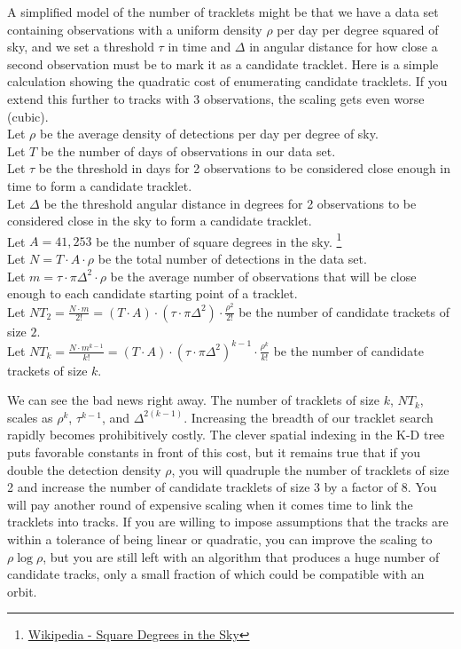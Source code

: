 A simplified model of the number of tracklets might be that we have a data set containing 
observations with a uniform density $\rho$ per day per degree squared of sky,
and we set a threshold $\tau$ in time and $\Delta$ in angular distance for how close a second observation must be to mark it as a candidate tracklet.
Here is a simple calculation showing the quadratic cost of enumerating candidate tracklets. 
If you extend this further to tracks with 3 observations, the scaling gets even worse (cubic).\\
Let $\rho$ be the average density of detections per day per degree of sky.\\
Let $T$ be the number of days of observations in our data set.\\
Let $\tau$ be the threshold in days for 2 observations to be considered close enough in time to form a candidate tracklet.\\
Let $\Delta$ be the threshold angular distance in degrees for 2 observations to be considered close in the sky to form a candidate tracklet.\\
Let $A = 41,253$ be the number of square degrees in the sky.
\footnote{\href{https://en.wikipedia.org/wiki/Square_degree}{Wikipedia - Square Degrees in the Sky}}\\
Let $N = T \cdot A \cdot \rho $ be the total number of detections in the data set.\\
Let $\displaystyle{m = \tau \cdot \pi \Delta^2 \cdot \rho}$ be the average number of observations that will be close enough
to each candidate starting point of a tracklet.\\
Let $\displaystyle{NT_{2} = \frac{N \cdot m}{2!} = (T \cdot A) \cdot (\tau \cdot \pi \Delta^2) \cdot \frac{\rho^{2}}{2!} }$ 
be the number of candidate trackets of size $2$. \\
Let $\displaystyle{NT_{k} = \frac{N \cdot m^{k-1}}{k!} = (T \cdot A) \cdot (\tau \cdot \pi \Delta^2)^{k-1} \cdot \frac{\rho^{k}}{k!} }$ 
be the number of candidate trackets of size $k$.

We can see the bad news right away.
The number of tracklets of size $k$, $NT_{k}$, scales as $\rho^{k}$, $\tau^{k-1}$, and $\Delta^{2(k-1)}$.
Increasing the breadth of our tracklet search rapidly becomes prohibitively costly.
The clever spatial indexing in the K-D tree puts favorable constants in front of this cost,
but it remains true that if you double the detection density $\rho$, you will quadruple the number of tracklets of size 2
and increase the number of candidate tracklets of size 3 by a factor of 8.
You will pay another round of expensive scaling when it comes time to link the tracklets into tracks.
If you are willing to impose assumptions that the tracks are within a tolerance of being linear or quadratic, 
you can improve the scaling to $\rho \log \rho$, 
but you are still left with an algorithm that produces a huge number of candidate tracks,
only a small fraction of which could be compatible with an orbit.

